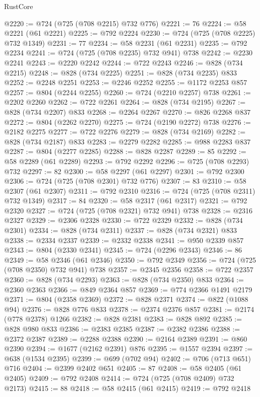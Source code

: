 \begin{lexlean}{RustCore}
\begin{coremodule}
@2220 := @724 (@725 (@708 @2215) @732 @776)
@2221 := 76
@2224 := @58 @2221 (@61 @2221)
@2225 := @792 @2224
@2230 := @724 (@725 (@708 @2225) @732 @1349)
@2231 := 77
@2234 := @58 @2231 (@61 @2231)
@2235 := @792 @2234
@2241 := @724 (@725 (@708 @2235) @732 @941) @738
@2242 := @2230 @2241
@2243 := @2220 @2242
@2244 := @722 @2243
@2246 := @828 (@734 @2215)
@2248 := @828 (@734 @2225)
@2251 := @828 (@734 @2235) @833
@2252 := @2248 @2251
@2253 := @2246 @2252
@2255 := @1172 @2253 @857
@2257 := @804 (@2244 @2255)
@2260 := @724 (@2210 @2257) @738
@2261 := @2202 @2260
@2262 := @722 @2261
@2264 := @828 (@734 @2195)
@2267 := @828 (@734 @2207) @833
@2268 := @2264 @2267
@2270 := @826 @2268 @837
@2272 := @804 (@2262 @2270)
@2275 := @724 (@2190 @2272) @738
@2276 := @2182 @2275
@2277 := @722 @2276
@2279 := @828 (@734 @2169)
@2282 := @828 (@734 @2187) @833
@2283 := @2279 @2282
@2285 := @988 @2283 @837
@2287 := @804 (@2277 @2285)
@2288 := @828 @2287
@2289 := 85
@2292 := @58 @2289 (@61 @2289)
@2293 := @792 @2292
@2296 := @725 (@708 @2293) @732
@2297 := 82
@2300 := @58 @2297 (@61 @2297)
@2301 := @792 @2300
@2306 := @724 (@725 (@708 @2301) @732 @776)
@2307 := 83
@2310 := @58 @2307 (@61 @2307)
@2311 := @792 @2310
@2316 := @724 (@725 (@708 @2311) @732 @1349)
@2317 := 84
@2320 := @58 @2317 (@61 @2317)
@2321 := @792 @2320
@2327 := @724 (@725 (@708 @2321) @732 @941) @738
@2328 := @2316 @2327
@2329 := @2306 @2328
@2330 := @722 @2329
@2332 := @828 (@734 @2301)
@2334 := @828 (@734 @2311)
@2337 := @828 (@734 @2321) @833
@2338 := @2334 @2337
@2339 := @2332 @2338
@2341 := @950 @2339 @857
@2343 := @804 (@2330 @2341)
@2345 := @724 (@2296 @2343)
@2346 := 86
@2349 := @58 @2346 (@61 @2346)
@2350 := @792 @2349
@2356 := @724 (@725 (@708 @2350) @732 @941) @738
@2357 := @2345 @2356
@2358 := @722 @2357
@2360 := @828 (@734 @2293)
@2363 := @828 (@734 @2350) @833
@2364 := @2360 @2363
@2366 := @849 @2364 @857
@2369 := @774 @2366 @1491 @2179
@2371 := @804 (@2358 @2369)
@2372 := @828 @2371
@2374 := @822 (@1088 @94)
@2376 := @828 @776 @833
@2378 := @2374 @2376 @857
@2381 := @2174 (@778 @2378) @1266
@2382 := @828 @2381
@2383 := @828 @892
@2385 := @828 @980 @833
@2386 := @2383 @2385
@2387 := @2382 @2386
@2388 := @2372 @2387
@2389 := @2288 @2388
@2390 := @2164 @2389
@2391 := @860 @2390
@2394 := @1677 (@2162 @2391) @876
@2395 := @1557 @2394
@2397 := @638 (@1534 @2395)
@2399 := @699 (@702 @94)
@2402 := @706 (@713 @651) @716
@2404 := @2399 @2402 @651
@2405 := 87
@2408 := @58 @2405 (@61 @2405)
@2409 := @792 @2408
@2414 := @724 (@725 (@708 @2409) @732 @2173)
@2415 := 88
@2418 := @58 @2415 (@61 @2415)
@2419 := @792 @2418

\end{coremodule}
\end{lexlean}
